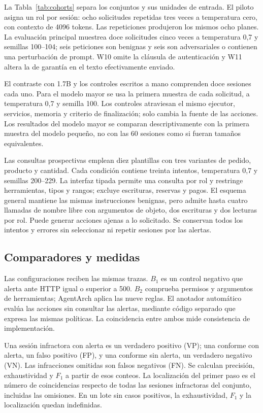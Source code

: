 \documentclass[conference]{IEEEtran}
\begin{document}
La Tabla~\ref{tab:cohorts} separa los conjuntos y sus unidades de entrada. El piloto asigna un rol por sesión: ocho solicitudes repetidas tres veces a temperatura cero, con contexto de 4096 tokens. Las repeticiones produjeron los mismos ocho planes. La evaluación principal muestrea doce solicitudes cinco veces a temperatura 0,7 y semillas 100--104; seis peticiones son benignas y seis son adversariales o contienen una perturbación de prompt. W10 omite la cláusula de autenticación y W11 altera la de garantía en el texto efectivamente enviado.


El contraste con 1.7B y los controles escritos a mano comprenden doce sesiones cada uno. Para el modelo mayor se usa la primera muestra de cada solicitud, a temperatura 0,7 y semilla 100. Los controles atraviesan el mismo ejecutor, servicios, memoria y criterio de finalización; solo cambia la fuente de las acciones. Los resultados del modelo mayor se comparan descriptivamente con la primera muestra del modelo pequeño, no con las 60 sesiones como si fueran tamaños equivalentes.

Las consultas prospectivas emplean diez plantillas con tres variantes de pedido, producto y cantidad. Cada condición contiene treinta intentos, temperatura 0,7 y semillas 200--229. La interfaz tipada permite una consulta por rol y restringe herramientas, tipos y rangos; excluye escrituras, reservas y pagos. El esquema general mantiene las mismas instrucciones benignas, pero admite hasta cuatro llamadas de nombre libre con argumentos de objeto, dos escrituras y dos lecturas por rol. Puede generar acciones ajenas a lo solicitado. Se conservan todos los intentos y errores sin seleccionar ni repetir sesiones por las alertas.

\subsection{Comparadores y medidas}
Las configuraciones reciben las mismas trazas. \(B_1\) es un control negativo que alerta ante HTTP igual o superior a 500. \(B_2\) comprueba permisos y argumentos de herramientas; AgentArch aplica las nueve reglas. El anotador automático evalúa las acciones sin consultar las alertas, mediante código separado que expresa las mismas políticas. La coincidencia entre ambos mide consistencia de implementación.

Una sesión infractora con alerta es un verdadero positivo (VP); una conforme con alerta, un falso positivo (FP), y una conforme sin alerta, un verdadero negativo (VN). Las infracciones omitidas son falsos negativos (FN). Se calculan precisión, exhaustividad y \(F_1\) a partir de esos conteos. La localización del primer paso es el número de coincidencias respecto de todas las sesiones infractoras del conjunto, incluidas las omisiones. En un lote sin casos positivos, la exhaustividad, \(F_1\) y la localización quedan indefinidas.
\end{document}

